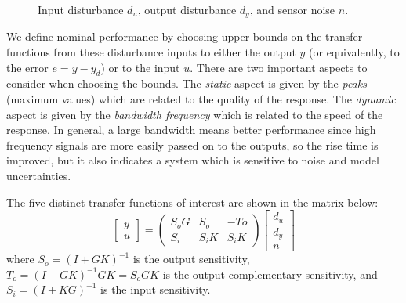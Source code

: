 \documentclass[12pt,lot, lof]{puthesis}
\begin{document}
\begin{figure}[htbp]
	\centering
	\caption{Input disturbance $d_u$, output disturbance $d_y$, and sensor noise $n$.}
	\label{fig:disturbances}
\end{figure}

We define nominal performance by choosing upper bounds on the transfer functions from these disturbance inputs to either the output $y$ (or equivalently, to the error $e = y - y_d$) or to the input $u$.
There are two important aspects to consider when choosing the bounds.
The \emph{static} aspect is given by the \emph{peaks} (maximum values) which are related to the quality of the response.
The \emph{dynamic} aspect is given by the \emph{bandwidth frequency} which is related to the speed of the response.
In general, a large bandwidth means better performance since high frequency signals are more easily passed on to the outputs, so the rise time is improved, but it also indicates a system which is sensitive to noise and model uncertainties.

The five distinct transfer functions of interest are shown in the matrix below:
\begin{equation}
	\renewcommand\arraystretch{0.8}
	\begin{bmatrix} y \\ u \end{bmatrix} =
	\begin{pmatrix} S_o G & S_o & -To \\ S_i & S_i K & S_i K \end{pmatrix}
	\begin{bmatrix} d_u \\ d_y \\ n \end{bmatrix}
\end{equation}
where $S_o = (I + G K)^{-1}$ is the output sensitivity, $T_o = (I + G K)^{-1} G K = S_o G K$ is the output complementary sensitivity, and $S_i = (I + K G)^{-1}$ is the input sensitivity.
\end{document}
